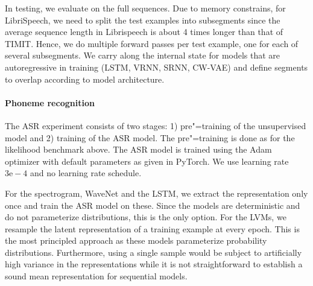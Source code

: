 {In testing, we evaluate on the full sequences. Due to memory constrains, for LibriSpeech, we need to split the test examples into subsegments since the average sequence length in Librispeech is about 4 times longer than that of TIMIT. Hence, we do multiple forward passes per test example, one for each of several subsegments. We carry along the internal state for models that are autoregressive in training (LSTM, VRNN, SRNN, CW-VAE) and define segments to overlap according to model architecture.

\paragraph{Phoneme recognition}
The ASR experiment consists of two stages: 1) pre"=training of the unsupervised model and 2) training of the ASR model. The pre"=training is done as for the likelihood benchmark above. The ASR model is trained using the Adam optimizer \parencite{kingma_adam_2015} with default parameters as given in PyTorch. We use learning rate $3\text{e}-4$ and no learning rate schedule. 

For the spectrogram, WaveNet and the LSTM, we extract the representation only once and train the ASR model on these. Since the models are deterministic and do not parameterize distributions, this is the only option. For the LVMs, we resample the latent representation of a training example at every epoch. This is the most principled approach as these models parameterize probability distributions. Furthermore, using a single sample would be subject to artificially high variance in the representations while it is not straightforward to establish a sound mean representation for sequential models.



}
